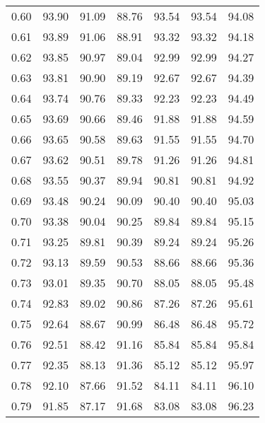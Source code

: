 \begin{tabular}{|c|c|c|c|c|c|c|}
      0.60 &     93.90 &     91.09 &      88.76 &   93.54 &      93.54 &         94.08 \\
      0.61 &     93.89 &     91.06 &      88.91 &   93.32 &      93.32 &         94.18 \\
      0.62 &     93.85 &     90.97 &      89.04 &   92.99 &      92.99 &         94.27 \\
      0.63 &     93.81 &     90.90 &      89.19 &   92.67 &      92.67 &         94.39 \\
      0.64 &     93.74 &     90.76 &      89.33 &   92.23 &      92.23 &         94.49 \\
      0.65 &     93.69 &     90.66 &      89.46 &   91.88 &      91.88 &         94.59 \\
      0.66 &     93.65 &     90.58 &      89.63 &   91.55 &      91.55 &         94.70 \\
      0.67 &     93.62 &     90.51 &      89.78 &   91.26 &      91.26 &         94.81 \\
      0.68 &     93.55 &     90.37 &      89.94 &   90.81 &      90.81 &         94.92 \\
      0.69 &     93.48 &     90.24 &      90.09 &   90.40 &      90.40 &         95.03 \\
      0.70 &     93.38 &     90.04 &      90.25 &   89.84 &      89.84 &         95.15 \\
      0.71 &     93.25 &     89.81 &      90.39 &   89.24 &      89.24 &         95.26 \\
      0.72 &     93.13 &     89.59 &      90.53 &   88.66 &      88.66 &         95.36 \\
      0.73 &     93.01 &     89.35 &      90.70 &   88.05 &      88.05 &         95.48 \\
      0.74 &     92.83 &     89.02 &      90.86 &   87.26 &      87.26 &         95.61 \\
      0.75 &     92.64 &     88.67 &      90.99 &   86.48 &      86.48 &         95.72 \\
      0.76 &     92.51 &     88.42 &      91.16 &   85.84 &      85.84 &         95.84 \\
      0.77 &     92.35 &     88.13 &      91.36 &   85.12 &      85.12 &         95.97 \\
      0.78 &     92.10 &     87.66 &      91.52 &   84.11 &      84.11 &         96.10 \\
      0.79 &     91.85 &     87.17 &      91.68 &   83.08 &      83.08 &         96.23 \\

\end{tabular}
